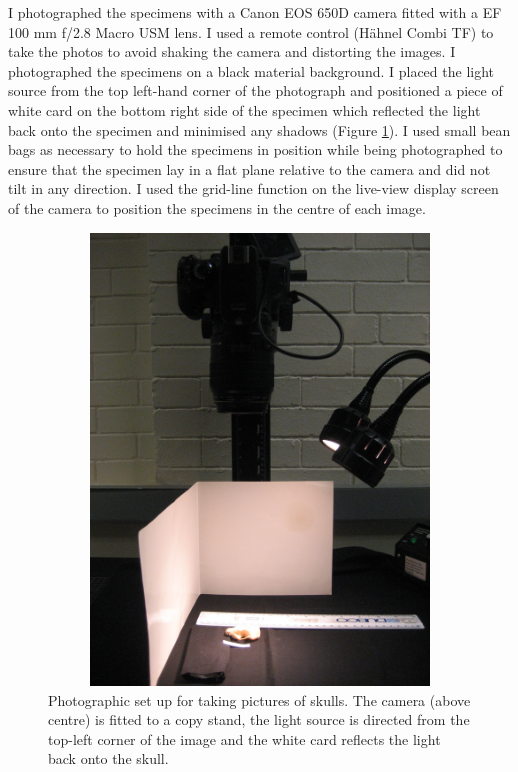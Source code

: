 	I photographed the specimens with a Canon EOS 650D camera fitted with a EF 100 mm f/2.8 Macro USM lens. I used a remote control (H\"ahnel Combi TF) to take the photos to avoid shaking the camera and distorting the images. I photographed the specimens on a black material background. I placed the light source from the top left-hand corner of the photograph and positioned a piece of white card on the bottom right side of the specimen which reflected the light back onto the specimen and minimised any shadows (Figure \ref{fig:camera}). I used small bean bags as necessary to hold the specimens in position while being photographed to ensure that the specimen lay in a flat plane relative to the camera and did not tilt in any direction. I used the grid-line function on the live-view display screen of the camera to position the specimens in the centre of each image. 

\begin{figure}[h] 
  \centering
  \includegraphics[width=12cm, height=12cm, keepaspectratio=true]{Methods/figures/camera.jpg}
    \caption[Photographic set up]
    {Photographic set up for taking pictures of skulls. The camera (above centre) is fitted to a copy stand, the light source is directed from the top-left corner of the image and the white card reflects the light back onto the skull. }
  \label{fig:camera}
  \end{figure}

